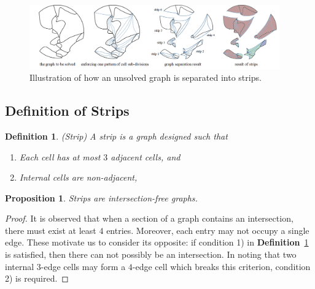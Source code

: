 \documentclass[journal]{IEEEtran}
\newtheorem{definition}[theorem]{Definition}
\newtheorem{proposition}[theorem]{Proposition}
\begin{document}
\begin{figure}[t]
\centering
\includegraphics[width =0.96\textwidth]{figures/graph_separation_3}
\caption{Illustration of how an unsolved graph is separated into strips. }\label{fig:complicated_graph}
\end{figure}


\subsection{Definition of Strips}
\begin{definition}\label{def:strip}
(Strip) A strip is a graph designed such that 
\begin{enumerate}
\item Each cell has at most $3$ adjacent cells, and
\item Internal cells are non-adjacent, 
\end{enumerate}
\end{definition}

\begin{proposition}\label{proposition:strips}
Strips are intersection-free graphs. 
\end{proposition}
\begin{proof}
It is observed that when a section of a graph contains an intersection, there must exist at least $4$ entries. 
Moreover, each entry may not occupy a single edge.  
These motivate us to consider its opposite: if condition 1) in \textbf{Definition}~\ref{def:strip} is satisfied, then there can not possibly be an intersection. 
In noting that two internal $3$-edge cells may form a $4$-edge cell which breaks this criterion, condition 2) is required. 
\end{proof}
\end{document}
